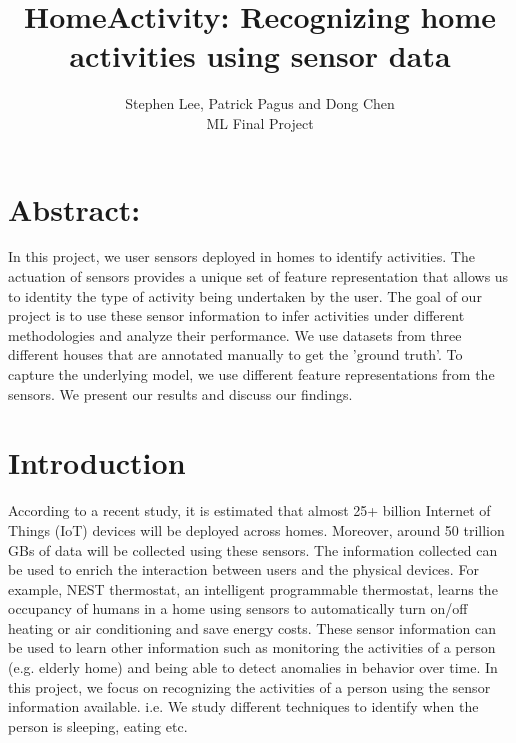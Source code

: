 \documentclass[11pt, oneside]{article}   	%
\title{HomeActivity: Recognizing home activities using sensor data}
\author{Stephen Lee, Patrick Pagus and Dong Chen\\ 
ML Final Project}
\begin{document}
\maketitle
\section{Abstract:}

In this project, we user sensors deployed in homes to identify activities. The actuation of sensors provides a unique set of feature representation that allows us to identity 
the type of activity being undertaken by the user. The goal of our project is to use these sensor information to infer activities under different methodologies and analyze their 
performance.  We use datasets from three different houses that are annotated manually to get the 'ground truth'.  To capture the underlying model, we use different feature representations from the sensors. We present our results and discuss our findings. 
 


\section{Introduction}
According to a recent study,  it is estimated that almost 25+ billion Internet of Things (IoT) devices will be deployed across homes. Moreover, around 50 trillion GBs of 
data will be collected using these sensors. The information collected can be used to enrich the interaction between users and the physical devices. For example, NEST thermostat, 
an intelligent programmable thermostat, learns the occupancy of humans in a home using sensors to automatically turn on/off heating or air conditioning and save energy costs. These sensor information can be used to learn other information such as monitoring the activities of a person (e.g. elderly home) and being able to detect anomalies in behavior over time. In this project, we focus on recognizing the activities of a person using the sensor information available. i.e. We study different techniques to identify when the person is sleeping, eating etc. 
\end{document}
